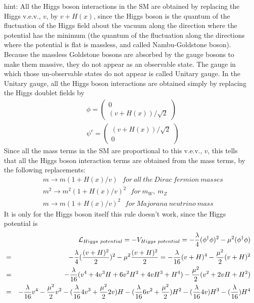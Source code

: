 \documentclass[12pt]{article}
\begin{document}
hint: All the Higgs boson interactions in the SM are obtained by
  replacing the Higgs v.e.v., $v$, by $v + H(x)$, since the Higgs boson is
  the quantum of the fluctuation of the Higgs field about the vacuum
  along the direction where the potential has the minimum (the quantum of
  the fluctuation along the directions where the potential is flat is
  massless, and called Nambu-Goldstone boson). Because the massless
  Goldstone bosons are absorbed by the gauge bosons to make them massive,
  they do not appear as an observable state. The gauge in which those
  un-observable states do not appear is called Unitary gauge.  In the
  Unitary gauge, all the Higgs boson interactions are obtained simply by
  replacing the Higgs doublet fields by
\begin{eqnarray}
  &&\phi   = 
  \begin{pmatrix}
    0 \\ (v+H(x))/\sqrt{2}
  \end{pmatrix}\label{eq.17_30a}\\
  &&\psi^c =
  \begin{pmatrix}
    (v+H(x))/\sqrt{2} \\ 0
  \end{pmatrix}\label{eq.17_30b}
\end{eqnarray}
  Since all the mass terms in the SM are proportional to this v.e.v., $v$,
  this tells that all the Higgs boson interaction terms are obtained
  from the mass terms, by the following replacements:
\begin{eqnarray}
  &&m   \to m   ( 1 + H(x)/v )  ~~~  for~ all ~the ~Dirac ~fermion ~masses\label{eq.17_31a}\\
  && m^2\to m^2 ( 1 + H(x)/v )^2  ~~~for~ m_W, ~m_Z \label{eq.17_31b}\\
  && m   \to m   ( 1 + H(x)/v )^2  ~~~for ~Majorana ~neutrino ~mass\label{eq.17_31c}
\end{eqnarray}
  It is only for the Higgs boson itself this rule doesn't work, since
  the Higgs potential is
\begin{eqnarray}
  &&{\cal L}_{Higgs~potential}
  = -V_{Higgs~potential}
  = -\frac{\lambda}{4} (\phi^\dagger \phi)^2 -\mu^2 (\phi^\dagger \phi)\\ 
  &=& -\frac{\lambda}{4}(\frac{(v+H)^2}{2})^2 -\mu^2 \frac{(v+H)^2}{2}
  = -\frac{\lambda}{16} (v+H)^4 -\frac{\mu^2}{2} (v+H)^2 \\
  &=& -\frac{\lambda}{16}(v^4 + 4v^3 H +6v^2 H^2 +4v H^3 +H^4)
    -\frac{\mu^2}{2} (v^2 + 2vH + H^2) \\
  &=& -\frac{\lambda}{16} v^4 -\frac{\mu^2}{2} v^2
   -(\frac{\lambda}{16} 4v^3 + \frac{\mu^2}{2} 2v) H
   -(\frac{\lambda}{16} 6v^2 + \frac{\mu^2}{2}) H^2
   -(\frac{\lambda}{16} 4v) H^3
   -(\frac{\lambda}{16}) H^4 \label{eq.17_32}
\end{eqnarray}
\end{document}
